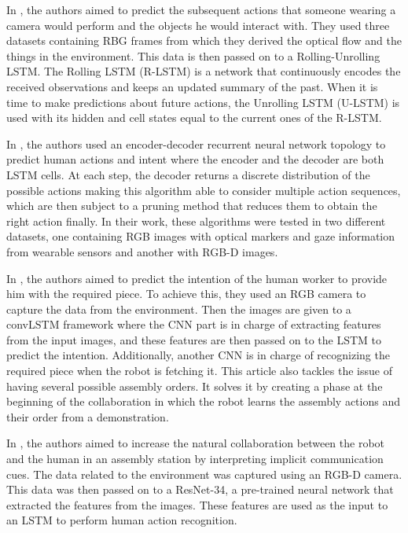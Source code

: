 In \cite{Furnari2021}, the authors aimed to predict the subsequent actions that someone wearing a camera would perform and the objects he would interact with. They used three datasets containing RBG frames from which they derived the optical flow and the things in the environment. This data is then passed on to a Rolling-Unrolling LSTM. The Rolling LSTM (R-LSTM) is a network that continuously encodes the received observations and keeps an updated summary of the past. When it is time to make predictions about future actions, the Unrolling LSTM (U-LSTM) is used with its hidden and cell states equal to the current ones of the R-LSTM.

In \cite{Schydlo2018}, the authors used an encoder-decoder recurrent neural network topology to predict human actions and intent where the encoder and the decoder are both LSTM cells. At each step, the decoder returns a discrete distribution of the possible actions making this algorithm able to consider multiple action sequences, which are then subject to a pruning method that reduces them to obtain the right action finally. In their work, these algorithms were tested in two different datasets, one containing RGB images with optical markers and gaze information from wearable sensors and another with RGB-D images.

In \cite{Zhang2022}, the authors aimed to predict the intention of the human worker to provide him with the required piece. To achieve this, they used an RGB camera to capture the data from the environment. Then the images are given to a convLSTM framework where the CNN part is in charge of extracting features from the input images, and these features are then passed on to the LSTM to predict the intention. Additionally, another CNN is in charge of recognizing the required piece when the robot is fetching it. This article also tackles the issue of having several possible assembly orders. It solves it by creating a phase at the beginning of the collaboration in which the robot learns the assembly actions and their order from a demonstration.

In \cite{Moutinho2023}, the authors aimed to increase the natural collaboration between the robot and the human in an assembly station by interpreting implicit communication cues. The data related to the environment was captured using an RGB-D camera. This data was then passed on to a ResNet-34, a pre-trained neural network that extracted the features from the images. These features are used as the input to an LSTM to perform human action recognition.

